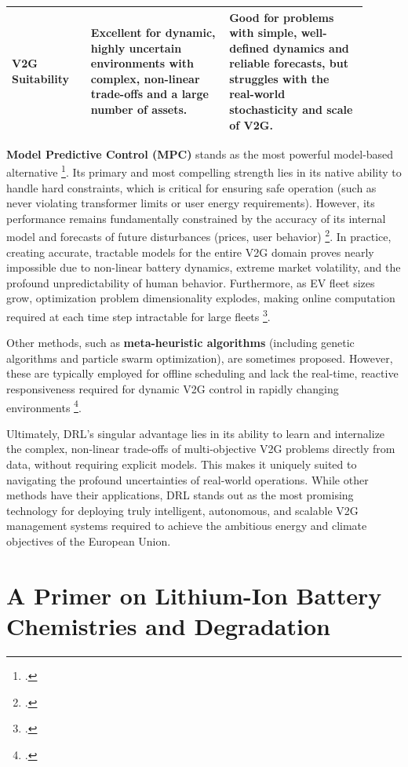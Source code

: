 \begin{table}[H]
{\begin{tabular}{|p{0.2\linewidth}|p{0.35\linewidth}|p{0.35\linewidth}|}
\hline
\textbf{V2G Suitability} & Excellent for dynamic, highly uncertain environments with complex, non-linear trade-offs and a large number of assets. & Good for problems with simple, well-defined dynamics and reliable forecasts, but struggles with the real-world stochasticity and scale of V2G. \\
\hline
\end{tabular}
}
\end{table}

\noindent
\textbf{Model Predictive Control (MPC)} stands as the most powerful model-based alternative \footcite{alsabbagh2022reinforcement}. Its primary and most compelling strength lies in its native ability to handle hard constraints, which is critical for ensuring safe operation (such as never violating transformer limits or user energy requirements). However, its performance remains fundamentally constrained by the accuracy of its internal model and forecasts of future disturbances (prices, user behavior) \footcite{faggio2023design}. In practice, creating accurate, tractable models for the entire V2G domain proves nearly impossible due to non-linear battery dynamics, extreme market volatility, and the profound unpredictability of human behavior. Furthermore, as EV fleet sizes grow, optimization problem dimensionality explodes, making online computation required at each time step intractable for large fleets \footcite{schwenk2022computationally}.

\noindent
Other methods, such as \textbf{meta-heuristic algorithms} (including genetic algorithms and particle swarm optimization), are sometimes proposed. However, these are typically employed for offline scheduling and lack the real-time, reactive responsiveness required for dynamic V2G control in rapidly changing environments \footcite{kumar2024integration}.

\noindent
Ultimately, DRL's singular advantage lies in its ability to learn and internalize the complex, non-linear trade-offs of multi-objective V2G problems directly from data, without requiring explicit models. This makes it uniquely suited to navigating the profound uncertainties of real-world operations. While other methods have their applications, DRL stands out as the most promising technology for deploying truly intelligent, autonomous, and scalable V2G management systems required to achieve the ambitious energy and climate objectives of the European Union.

\newpage
\section{A Primer on Lithium-Ion Battery Chemistries and Degradation}

